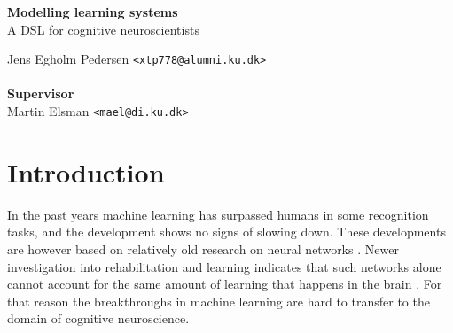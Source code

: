 \documentclass[a4paper,oneside]{memoir}
\begin{document}
    \thispagestyle{empty}
    \begin{adjustwidth}{-3cm}{-1.5cm}
    \vspace*{2.5cm}
    \textbf{\Huge Modelling learning systems} \\
    \vspace*{.8cm}
    {\huge  A DSL for cognitive neuroscientists}\\
    \begin{tabbing}
    Jens Egholm Pedersen \hspace{1cm} \= \texttt{<xtp778@alumni.ku.dk>} \\
    \\[11cm]

    \textbf{\Large Supervisor} \\
    Martin Elsman \hspace{1cm} \texttt{<mael@di.ku.dk>}
    \end{tabbing}
    \end{adjustwidth}

    \newpage

    \ClearWallPaper

\renewcommand\cftchapteraftersnumb{\normalfont}
\renewcommand\cftbeforechapterskip{5pt plus 1pt}

\frontmatter
\tableofcontents*
\newpage

\mainmatter
\chapter{Introduction}
In the past years machine learning has surpassed humans in some recognition
tasks, and the development shows no signs of slowing down.
These developments are however based on relatively old research on neural
networks \autocite{Nilsson2009, russel2007}.
Newer investigation into rehabilitation and learning indicates that such
networks alone cannot account for the same amount of learning that happens
in the brain \autocite{Mogensen2011, block2007, russel2007, Moravec98, dennett2017}.
For that reason the breakthroughs in machine learning are hard to transfer
to the domain of cognitive neuroscience.
\end{document}
